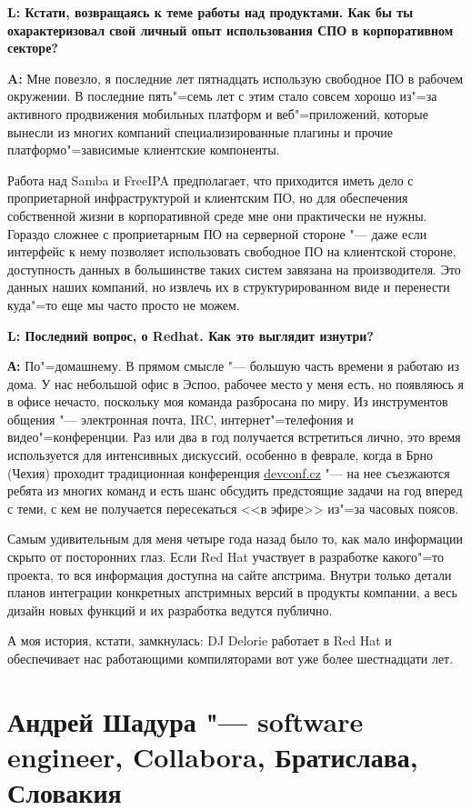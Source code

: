 \documentclass[10pt, a5paper]{article}
\begin{document}
{\noindent \bf L: Кстати, возвращаясь к теме работы над продуктами. Как бы ты охарактеризовал свой личный опыт использования СПО в корпоративном секторе?}

{\noindent \bf A:} Мне повезло, я последние лет пятнадцать использую свободное ПО в рабочем окружении. В
последние пять"=семь лет с этим стало совсем хорошо из"=за активного продвижения
мобильных платформ и веб"=приложений, которые вынесли из многих компаний
специализированные плагины и прочие платформо"=зависимые клиентские компоненты.

Работа над Samba и FreeIPA предполагает, что приходится иметь дело с
проприетарной инфраструктурой и клиентским ПО, но для обеспечения собственной
жизни в корпоративной среде мне они практически не нужны. Гораздо сложнее
с проприетарным ПО на серверной стороне "--- даже если интерфейс к нему позволяет
использовать свободное ПО на клиентской стороне, доступность данных в
большинстве таких систем завязана на производителя. Это данных наших компаний,
но извлечь их в структурированном виде и перенести куда"=то еще мы часто просто
не можем.

{\noindent \bf L: Последний вопрос, о Redhat. Как это выглядит изнутри?}

{\noindent \bf А:} По"=домашнему. В прямом смысле "--- большую часть времени
я работаю из дома. У нас небольшой офис в Эспоо, рабочее место у меня есть, но
появляюсь я в офисе нечасто, поскольку моя команда разбросана по миру. Из инструментов
общения "--- электронная почта, IRC, интернет"=телефония и видео"=конференции.
Раз или два в год получается встретиться лично, это время используется для интенсивных
дискуссий, особенно в феврале, когда в Брно (Чехия) проходит традиционная конференция
\url{devconf.cz} "--- на нее съезжаются ребята из многих команд и есть шанс обсудить
предстоящие задачи на год вперед с теми, с кем не получается пересекаться <<в эфире>>
из"=за часовых поясов.

Самым удивительным для меня четыре года назад было то, как мало информации скрыто от
посторонних глаз. Если Red Hat участвует в разработке какого"=то проекта, то вся информация
доступна на сайте апстрима. Внутри только детали планов интеграции конкретных апстримных
версий в продукты компании, а весь дизайн новых функций и их разработка ведутся публично.

А моя история, кстати, замкнулась: DJ Delorie работает в Red Hat и обеспечивает нас
работающими компиляторами вот уже более шестнадцати лет.


\section[Андрей Шадура "--- software engineer, Collabora, Братислава, Словакия]{Андрей Шадура "--- software engineer, \linebreak Collabora, Братислава, Словакия}
\end{document}
